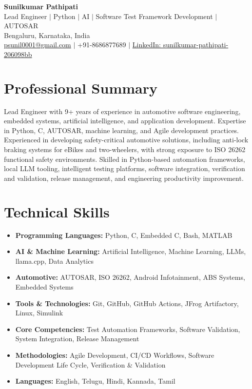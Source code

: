 \documentclass[11pt,a4paper]{article}
\begin{document}
\begin{center}
    \textbf{\LARGE Sunilkumar Pathipati} \\
    \vspace{4pt}
    \small Lead Engineer $|$ Python $|$ AI $|$ Software Test Framework Development $|$ AUTOSAR \\
    \vspace{4pt}
    \small Bengaluru, Karnataka, India \\
    \vspace{2pt}
    \small \href{mailto:psunil0001@gmail.com}{psunil0001@gmail.com} $|$ 
    +91-8686877689 $|$
    \href{https://www.linkedin.com/in/sunilkumar-pathipati-206098bb}{LinkedIn: sunilkumar-pathipati-206098bb}
\end{center}

\section{Professional Summary}
Lead Engineer with 9+ years of experience in automotive software engineering, embedded systems, artificial intelligence, and application development. Expertise in Python, C, AUTOSAR, machine learning, and Agile development practices. Experienced in developing safety-critical automotive solutions, including anti-lock braking systems for eBikes and two-wheelers, with strong exposure to ISO 26262 functional safety environments. Skilled in Python-based automation frameworks, local LLM tooling, intelligent testing platforms, software integration, verification and validation, release management, and engineering productivity improvement.

\section{Technical Skills}
\begin{itemize}[leftmargin=0.15in]
    \item \textbf{Programming Languages:} Python, C, Embedded C, Bash, MATLAB
    \item \textbf{AI \& Machine Learning:} Artificial Intelligence, Machine Learning, LLMs, llama.cpp, Data Analytics
    \item \textbf{Automotive:} AUTOSAR, ISO 26262, Android Infotainment, ABS Systems, Embedded Systems
    \item \textbf{Tools \& Technologies:} Git, GitHub, GitHub Actions, JFrog Artifactory, Linux, Simulink
    \item \textbf{Core Competencies:} Test Automation Frameworks, Software Validation, System Integration, Release Management
    \item \textbf{Methodologies:} Agile Development, CI/CD Workflows, Software Development Life Cycle, Verification \& Validation
    \item \textbf{Languages:} English, Telugu, Hindi, Kannada, Tamil
\end{itemize}
\end{document}
